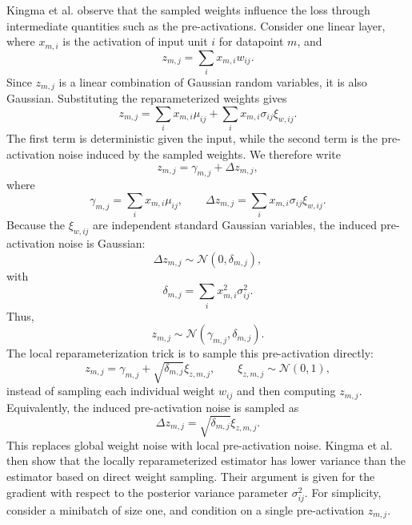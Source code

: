 Kingma et al. observe that the sampled weights influence the loss through intermediate quantities such as the pre-activations. Consider one linear layer, where \(x_{m,i}\) is the activation of input unit \(i\) for datapoint \(m\), and
\begin{equation}
z_{m,j}
=
\sum_i x_{m,i}w_{ij}.
\label{eq:lrt_preactivation}
\end{equation}
Since \(z_{m,j}\) is a linear combination of Gaussian random variables, it is also Gaussian. Substituting the reparameterized weights gives
\begin{equation}
z_{m,j}
=
\sum_i x_{m,i}\mu_{ij}
+
\sum_i x_{m,i}\sigma_{ij}\xi_{w,ij}.
\end{equation}
The first term is deterministic given the input, while the second term is the pre-activation noise induced by the sampled weights. We therefore write
\begin{equation}
z_{m,j}
=
\gamma_{m,j}
+
\Delta z_{m,j},
\end{equation}
where
\begin{equation}
\gamma_{m,j}
=
\sum_i x_{m,i}\mu_{ij},
\qquad
\Delta z_{m,j}
=
\sum_i x_{m,i}\sigma_{ij}\xi_{w,ij}.
\end{equation}
Because the \(\xi_{w,ij}\) are independent standard Gaussian variables, the induced pre-activation noise is Gaussian:
\begin{equation}
\Delta z_{m,j}
\sim
\mathcal{N}(0,\delta_{m,j}),
\label{eq:lrt_direct_induced_noise}
\end{equation}
with
\begin{equation}
\delta_{m,j}
=
\sum_i x_{m,i}^{2}\sigma_{ij}^{2}.
\end{equation}
Thus,
\begin{equation}
z_{m,j}
\sim
\mathcal{N}(\gamma_{m,j},\delta_{m,j}).
\end{equation}
The local reparameterization trick is to sample this pre-activation directly:
\begin{equation}
z_{m,j}
=
\gamma_{m,j}
+
\sqrt{\delta_{m,j}}\xi_{z,m,j},
\qquad
\xi_{z,m,j}
\sim
\mathcal{N}(0,1),
\label{eq:lrt_local_reparameterized_sampling}
\end{equation}
instead of sampling each individual weight \(w_{ij}\) and then computing \(z_{m,j}\). Equivalently, the induced pre-activation noise is sampled as
\begin{equation}
\Delta z_{m,j}
=
\sqrt{\delta_{m,j}}\xi_{z,m,j}.
\end{equation}
This replaces global weight noise with local pre-activation noise. 
Kingma et al. then show that the locally reparameterized estimator has lower variance than the estimator based on direct weight sampling. Their argument is given for the gradient with respect to the posterior variance parameter \(\sigma_{ij}^{2}\). For simplicity, consider a minibatch of size one, and condition on a single pre-activation \(z_{m,j}\).

